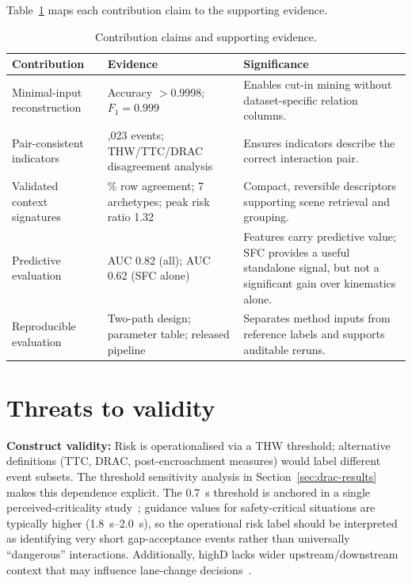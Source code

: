 \documentclass[12pt,a4paper,twoside,openright]{report}
\begin{document}
    Table~\ref{tab:contribution-evidence} maps each contribution claim to the supporting evidence.

    \begin{table}[H]
        \centering
        \caption{Contribution claims and supporting evidence.}
        \label{tab:contribution-evidence}
        {\small
        \setlength{\tabcolsep}{4pt}
        \renewcommand{\arraystretch}{1.15}
            \begin{tabularx}{\textwidth}{@{}>{\raggedright\arraybackslash}p{} >{\raggedright\arraybackslash}p{} X@{}}
\toprule
Contribution & Evidence & Significance \\
\midrule
Minimal-input reconstruction & Accuracy $>$0.9998; $F_1=0.999$ & Enables cut-in mining without dataset-specific relation columns. \\
Pair-consistent indicators & 10,023 events; THW/TTC/DRAC disagreement analysis & Ensures indicators describe the correct interaction pair. \\
Validated context signatures & 99.49\% row agreement; 7 archetypes; peak risk ratio 1.32 & Compact, reversible descriptors supporting scene retrieval and grouping. \\
Predictive evaluation & AUC 0.82 (all); AUC 0.62 (SFC alone) & Features carry predictive value; SFC provides a useful standalone signal, but not a significant gain over kinematics alone. \\
Reproducible evaluation & Two-path design; parameter table; released pipeline & Separates method inputs from reference labels and supports auditable reruns. \\
\bottomrule
            \end{tabularx}}
    \end{table}

    \section{Threats to validity}
    \textbf{Construct validity:} Risk is operationalised via a THW threshold; alternative definitions (TTC, DRAC, post-encroachment measures) would label different event subsets. The threshold sensitivity analysis in Section~\ref{sec:drac-results} makes this dependence explicit. The \SI{0.7}{\second} threshold is anchored in a single perceived-criticality study~\cite{tscharn2018thw}; guidance values for safety-critical situations are typically higher (\SIrange{1.8}{2.0}{\second}), so the operational risk label should be interpreted as identifying very short gap-acceptance events rather than universally ``dangerous'' interactions. Additionally, highD lacks wider upstream/downstream context that may influence lane-change decisions~\cite{wanggao2025highd}.
\end{document}
